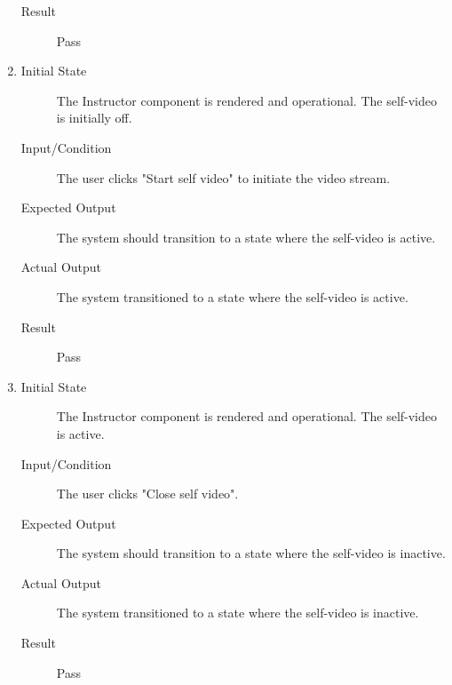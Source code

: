 \documentclass[12pt, titlepage]{article}
\begin{document}
\begin{enumerate}[UT-M1]
\begin{description}
    \item[Result] Pass
    \end{description}
  \item \label{UT-M4}
    \begin{description}
    \item[Initial State] The Instructor component is rendered and operational. The self-video is initially off.
    \item[Input/Condition] The user clicks "Start self video" to initiate the video stream.
    \item[Expected Output] The system should transition to a state where the self-video is active.
    \item[Actual Output] The system transitioned to a state where the self-video is active.
    \item[Result] Pass
    \end{description}
  \item \label{UT-M5}
    \begin{description}
    \item[Initial State] The Instructor component is rendered and operational. The self-video is active.
    \item[Input/Condition] The user clicks "Close self video".
    \item[Expected Output] The system should transition to a state where the self-video is inactive.
    \item[Actual Output] The system transitioned to a state where the self-video is inactive.
    \item[Result] Pass
    \end{description}
\end{enumerate}
\end{document}
